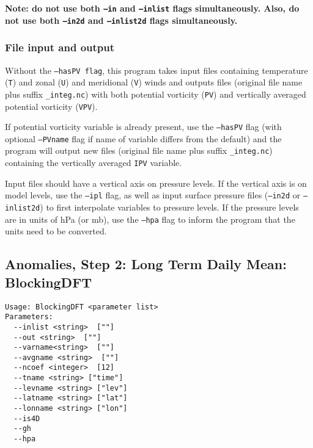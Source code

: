 \documentclass{article}
\begin{document}
\textbf{Note: do not use both \texttt{--in} and \texttt{--inlist} flags simultaneously. Also, do not use both \texttt{--in2d} and \texttt{--inlist2d} flags simultaneously.}

\subsubsection{File input and output}

Without the \texttt{--hasPV flag}, this program takes input files containing temperature (\texttt{T}) and zonal (\texttt{U}) and meridional (\texttt{V}) winds and outputs files  (original file name plus suffix \texttt{\_integ.nc}) with both potential vorticity (\texttt{PV}) and vertically averaged potential vorticity (\texttt{VPV}). 

If potential vorticity variable is already present,  use the \texttt{--hasPV} flag (with optional \texttt{--PVname} flag if name of variable differs from the default) and the program will output new files (original file name plus suffix \texttt{\_integ.nc}) containing the vertically averaged \texttt{IPV} variable.

Input files should have a vertical axis on pressure levels. If the vertical axis is on model levels, use the \texttt{--ipl} flag, as well as input surface pressure files (\texttt{--in2d} or \texttt{--inlist2d}) to first interpolate variables to pressure levels. If the pressure levels are in units of hPa (or mb), use the \texttt{--hpa} flag to inform the program that the units need to be converted.

\subsection{Anomalies, Step 2: Long Term Daily Mean: BlockingDFT}\label{avg}
\begin{verbatim}
Usage: BlockingDFT <parameter list>
Parameters:
  --inlist <string>  [""]
  --out <string>  [""]
  --varname<string>  [""]
  --avgname <string>  [""]
  --ncoef <integer>  [12]
  --tname <string> ["time"]
  --levname <string> ["lev"]
  --latname <string> ["lat"]
  --lonname <string> ["lon"]
  --is4D
  --gh
  --hpa
\end{verbatim}
\end{document}
